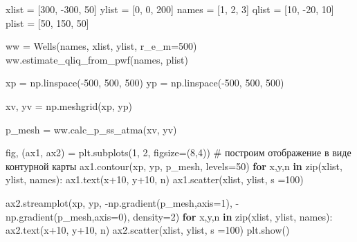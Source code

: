 \documentclass[
  russian,
  letterpaper,
  DIV=11,
  numbers=noendperiod,
  oneside]{scrartcl}
\newenvironment{Shaded}{\begin{snugshade}}{\end{snugshade}}
\newcommand{\BuiltInTok}[1]{\textcolor[rgb]{0.00,0.23,0.31}{#1}}
\newcommand{\CommentTok}[1]{\textcolor[rgb]{0.37,0.37,0.37}{#1}}
\newcommand{\ControlFlowTok}[1]{\textcolor[rgb]{0.00,0.23,0.31}{\textbf{#1}}}
\newcommand{\DecValTok}[1]{\textcolor[rgb]{0.68,0.00,0.00}{#1}}
\newcommand{\KeywordTok}[1]{\textcolor[rgb]{0.00,0.23,0.31}{\textbf{#1}}}
\newcommand{\NormalTok}[1]{\textcolor[rgb]{0.00,0.23,0.31}{#1}}
\newcommand{\OperatorTok}[1]{\textcolor[rgb]{0.37,0.37,0.37}{#1}}
\newcommand{\StringTok}[1]{\textcolor[rgb]{0.13,0.47,0.30}{#1}}
\begin{document}
\begin{Shaded}
\begin{Highlighting}[]
\NormalTok{xlist }\OperatorTok{=}\NormalTok{ [}\DecValTok{300}\NormalTok{, }\OperatorTok{{-}}\DecValTok{300}\NormalTok{, }\DecValTok{50}\NormalTok{]}
\NormalTok{ylist }\OperatorTok{=}\NormalTok{ [}\DecValTok{0}\NormalTok{, }\DecValTok{0}\NormalTok{, }\DecValTok{200}\NormalTok{]}
\NormalTok{names }\OperatorTok{=}\NormalTok{ [}\StringTok{\textquotesingle{}1\textquotesingle{}}\NormalTok{, }\StringTok{\textquotesingle{}2\textquotesingle{}}\NormalTok{, }\StringTok{\textquotesingle{}3\textquotesingle{}}\NormalTok{]}
\NormalTok{qlist }\OperatorTok{=}\NormalTok{ [}\DecValTok{10}\NormalTok{, }\OperatorTok{{-}}\DecValTok{20}\NormalTok{, }\DecValTok{10}\NormalTok{]}
\NormalTok{plist }\OperatorTok{=}\NormalTok{ [}\DecValTok{50}\NormalTok{, }\DecValTok{150}\NormalTok{, }\DecValTok{50}\NormalTok{]}

\NormalTok{ww }\OperatorTok{=}\NormalTok{ Wells(names, xlist, ylist, r\_e\_m}\OperatorTok{=}\DecValTok{500}\NormalTok{)}
\NormalTok{ww.estimate\_qliq\_from\_pwf(names, plist)}

\NormalTok{xp }\OperatorTok{=}\NormalTok{ np.linspace(}\OperatorTok{{-}}\DecValTok{500}\NormalTok{, }\DecValTok{500}\NormalTok{, }\DecValTok{500}\NormalTok{)}
\NormalTok{yp }\OperatorTok{=}\NormalTok{ np.linspace(}\OperatorTok{{-}}\DecValTok{500}\NormalTok{, }\DecValTok{500}\NormalTok{, }\DecValTok{500}\NormalTok{)}

\NormalTok{xv, yv }\OperatorTok{=}\NormalTok{ np.meshgrid(xp, yp)}

\NormalTok{p\_mesh }\OperatorTok{=}\NormalTok{ ww.calc\_p\_ss\_atma(xv, yv)}


\NormalTok{fig, (ax1, ax2) }\OperatorTok{=}\NormalTok{ plt.subplots(}\DecValTok{1}\NormalTok{, }\DecValTok{2}\NormalTok{, figsize}\OperatorTok{=}\NormalTok{(}\DecValTok{8}\NormalTok{,}\DecValTok{4}\NormalTok{))}
\CommentTok{\# построим отображение в виде контурной карты}
\NormalTok{ax1.contour(xp, yp, p\_mesh, levels}\OperatorTok{=}\DecValTok{50}\NormalTok{)}
\ControlFlowTok{for}\NormalTok{ x,y,n }\KeywordTok{in} \BuiltInTok{zip}\NormalTok{(xlist, ylist, names):}
\NormalTok{    ax1.text(x}\OperatorTok{+}\DecValTok{10}\NormalTok{, y}\OperatorTok{+}\DecValTok{10}\NormalTok{, n)}
\NormalTok{ax1.scatter(xlist, ylist, s }\OperatorTok{=}\DecValTok{100}\NormalTok{)}

\NormalTok{ax2.streamplot(xp, yp, }\OperatorTok{{-}}\NormalTok{np.gradient(p\_mesh,axis}\OperatorTok{=}\DecValTok{1}\NormalTok{), }
                       \OperatorTok{{-}}\NormalTok{np.gradient(p\_mesh,axis}\OperatorTok{=}\DecValTok{0}\NormalTok{), }
\NormalTok{               density}\OperatorTok{=}\DecValTok{2}\NormalTok{)}
\ControlFlowTok{for}\NormalTok{ x,y,n }\KeywordTok{in} \BuiltInTok{zip}\NormalTok{(xlist, ylist, names):}
\NormalTok{    ax2.text(x}\OperatorTok{+}\DecValTok{10}\NormalTok{, y}\OperatorTok{+}\DecValTok{10}\NormalTok{, n)}
\NormalTok{ax2.scatter(xlist, ylist, s }\OperatorTok{=}\DecValTok{100}\NormalTok{)}
\NormalTok{plt.show()}
\end{Highlighting}
\end{Shaded}
\end{document}
